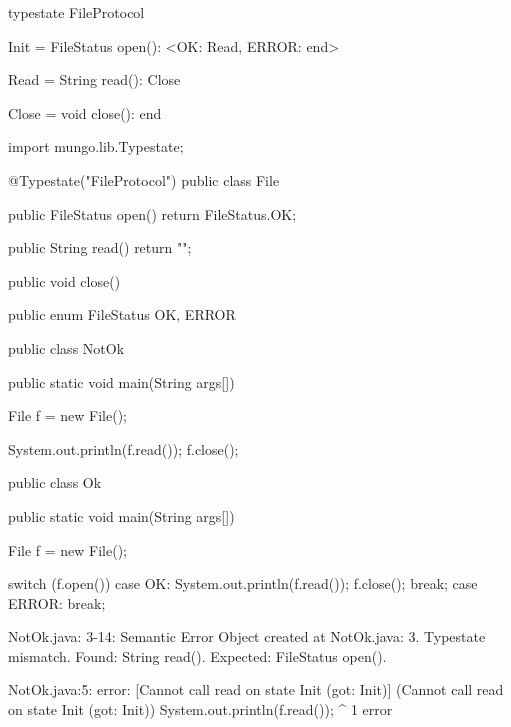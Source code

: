 \begin{code}
typestate FileProtocol {

  Init = {
    FileStatus open(): <OK: Read, ERROR: end>
  }

  Read = {
    String read(): Close
  }

  Close = {
    void close(): end
  }

}\end{code}

\begin{code}
import mungo.lib.Typestate;

@Typestate("FileProtocol")
public class File {

  public FileStatus open() {
    return FileStatus.OK;
  }

  public String read() {
    return "";
  }

  public void close() {

  }

}\end{code}

\begin{code}
public enum FileStatus {
  OK, ERROR
}\end{code}

\begin{code}
public class NotOk {
  public static void main(String args[]) {
    File f = new File();
    
    System.out.println(f.read());
    f.close();
  }
}\end{code}

\begin{code}
public class Ok {
  public static void main(String args[]) {
    File f = new File();

    switch (f.open()) {
      case OK:
        System.out.println(f.read());
        f.close();
        break;
      case ERROR:
        break;
    }
  }
}\end{code}

\lstset{language=,caption=Original Mungo output}
\begin{code}

NotOk.java: 3-14: Semantic Error
		Object created at NotOk.java: 3. Typestate mismatch. Found: String read(). Expected: FileStatus open().
\end{code}

\lstset{language=,caption=New Mungo output}
\begin{code}
NotOk.java:5: error: [Cannot call read on state Init (got: Init)] (Cannot call read on state Init (got: Init))
    System.out.println(f.read());
                             ^
1 error
\end{code}


